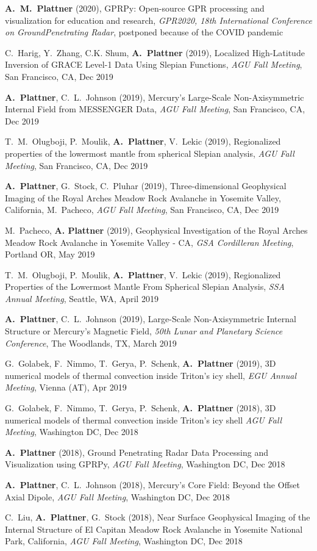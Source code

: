 \documentclass[10pt]{article}
\begin{document}
\spcp \textbf{A.~M.~Plattner} (2020), GPRPy: Open-source GPR processing
and visualization for education and research, \emph{GPR2020, 18th
International Conference on GroundPenetrating Radar}, postponed
because of the COVID pandemic

\spcp C.~Harig, Y.~Zhang, C.K. Shum, \textbf{A.~Plattner} (2019),
Localized High-Latitude Inversion of GRACE Level-1 Data Using Slepian Functions,
\emph{AGU Fall Meeting}, San Francisco, CA, Dec 2019

\spcp \textbf{A.~Plattner}, C.~L.~Johnson (2019), Mercury's
Large-Scale Non-Axisymmetric Internal Field from MESSENGER Data,
\emph{AGU Fall Meeting}, San Francisco, CA, Dec 2019

\spcp T.~M.~Olugboji, P.~Moulik, \textbf{A.~Plattner}, V.~Lekic (2019),
Regionalized properties of the lowermost mantle from spherical Slepian analysis,
\emph{AGU Fall Meeting}, San Francisco, CA, Dec 2019

\spcp \textbf{A.~Plattner}, G.~Stock, C.~Pluhar (2019),
Three-dimensional Geophysical Imaging of the Royal Arches Meadow Rock
Avalanche in Yosemite Valley, California, M.~Pacheco, \emph{AGU Fall
Meeting}, San Francisco, CA, Dec 2019

\spcp M.~Pacheco, \textbf{A. Plattner} (2019), Geophysical
Investigation of the Royal Arches Meadow Rock Avalanche in Yosemite
Valley - CA, \emph{GSA Cordilleran Meeting}, Portland OR, May 2019

\spcp T.~M.~Olugboji, P.~Moulik, \textbf{A.~Plattner}, V.~Lekic
(2019), Regionalized Properties of the Lowermost Mantle From Spherical
Slepian Analysis, \emph{SSA Annual Meeting}, Seattle, WA, April 2019

\spcp \textbf{A.~Plattner}, C.~L.~Johnson (2019),
Large-Scale Non-Axisymmetric Internal Structure or Mercury's Magnetic Field,
\emph{50th Lunar and Planetary Science Conference},
The Woodlands, TX, March 2019

\spcp G.~Golabek, F.~Nimmo, T.~Gerya, P.~Schenk, \textbf{A.~Plattner}
(2019), 3D numerical models of thermal convection inside Triton’s icy
shell, \emph{EGU Annual Meeting}, Vienna (AT), Apr 2019

\spcp G.~Golabek, F.~Nimmo, T.~Gerya, P.~Schenk, \textbf{A.~Plattner} (2018),
3D numerical models of thermal convection inside Triton's icy shell
\emph{AGU Fall Meeting}, Washington DC, Dec 2018

\spcp \textbf{A.~Plattner} (2018),
Ground Penetrating Radar Data Processing and Visualization using
GPRPy,
\emph{AGU Fall Meeting}, Washington DC, Dec 2018

\spcp \textbf{A.~Plattner}, C.~L.~Johnson (2018), 
Mercury's Core Field: Beyond the Offset Axial Dipole,
\emph{AGU Fall Meeting}, Washington DC, Dec 2018 


\spcp
C.~Liu, \textbf{A.~Plattner}, G.~Stock (2018),
Near Surface Geophysical Imaging of the Internal
Structure of El Capitan Meadow Rock Avalanche in Yosemite National
Park, California,
\emph{AGU Fall Meeting}, Washington DC, Dec 2018
\end{document}
